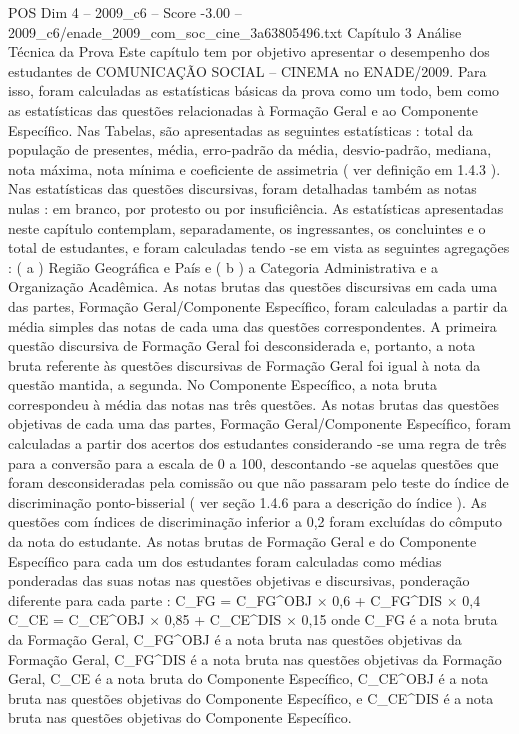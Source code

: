 \begin{textsample}{POS Dim 4 – 2009\_c6 – Score -3.00 – 2009\_c6/enade\_2009\_com\_soc\_cine\_3a63805496.txt}  \label{ex:f4_pos_322}
Capítulo 3 Análise Técnica da Prova Este capítulo tem por objetivo apresentar o desempenho dos estudantes de COMUNICAÇÃO SOCIAL – CINEMA no ENADE/2009.
Para isso, foram calculadas as estatísticas básicas da prova como um todo, bem como as estatísticas das questões relacionadas à Formação Geral e ao Componente Específico.
Nas Tabelas, são apresentadas as seguintes estatísticas : total da população de presentes, média, erro-padrão da média, desvio-padrão, mediana, nota máxima, nota mínima e coeficiente de assimetria ( ver definição em 1.4.3 ).
Nas estatísticas das questões discursivas, foram detalhadas também as notas nulas : em branco, por protesto ou por insuficiência.
As estatísticas apresentadas neste capítulo contemplam, separadamente, os ingressantes, os concluintes e o total de estudantes, e foram calculadas tendo -se em vista as seguintes agregações : ( a ) Região Geográfica e País e ( b ) a Categoria Administrativa e a Organização Acadêmica.
As notas brutas das questões discursivas em cada uma das partes, Formação Geral/Componente Específico, foram calculadas a partir da média simples das notas de cada uma das questões correspondentes.
A primeira questão discursiva de Formação Geral foi desconsiderada e, portanto, a nota bruta referente às questões discursivas de Formação Geral foi igual à nota da questão mantida, a segunda.
No Componente Específico, a nota bruta correspondeu à média das notas nas três questões.
As notas brutas das questões objetivas de cada uma das partes, Formação Geral/Componente Específico, foram calculadas a partir dos acertos dos estudantes considerando -se uma regra de três para a conversão para a escala de 0 a 100, descontando -se aquelas questões que foram desconsideradas pela comissão ou que não passaram pelo teste do índice de discriminação ponto-bisserial ( ver seção 1.4.6 para a descrição do índice ).
As questões com índices de discriminação inferior a 0,2 foram excluídas do cômputo da nota do estudante.
As notas brutas de Formação Geral e do Componente Específico para cada um dos estudantes foram calculadas como médias ponderadas das suas notas nas questões objetivas e discursivas, ponderação diferente para cada parte : C\_FG = C\_FG\textasciicircum{}OBJ × 0,6 + C\_FG\textasciicircum{}DIS × 0,4 C\_CE = C\_CE\textasciicircum{}OBJ × 0,85 + C\_CE\textasciicircum{}DIS × 0,15 onde C\_FG é a nota bruta da Formação Geral, C\_FG\textasciicircum{}OBJ é a nota bruta nas questões objetivas da Formação Geral, C\_FG\textasciicircum{}DIS é a nota bruta nas questões objetivas da Formação Geral, C\_CE é a nota bruta do Componente Específico, C\_CE\textasciicircum{}OBJ é a nota bruta nas questões objetivas do Componente Específico, e C\_CE\textasciicircum{}DIS é a nota bruta nas questões objetivas do Componente Específico.

\end{textsample}
